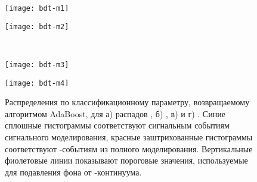 \begin{figure}[htb]
 \begin{minipage}[b]{0.5\textwidth}
  \centering
  \texttt{[image: bdt-m1]}
  \subcaption{}
  \label{fig:tmva_output_pi0}
 \end{minipage}
 \begin{minipage}[b]{0.5\textwidth}
  \centering
  \texttt{[image: bdt-m2]}
  \subcaption{}
  \label{fig:tmva_output_etagg}
 \end{minipage}
 \\
 \begin{minipage}[b]{0.5\textwidth}
  \centering
  \texttt{[image: bdt-m3]}
  \subcaption{}
  \label{fig:tmva_output_petappp}
 \end{minipage}
 \begin{minipage}[b]{0.5\textwidth}
  \centering
  \texttt{[image: bdt-m4]}
  \subcaption{}
  \label{fig:tmva_output_omega}
  \vspace{2 mm}
 \end{minipage}
  \caption{Распределения по классификационному параметру, возвращаемому алгоритмом AdaBoost, для а) распадов \bdpi, б) \bdetagg, в) \bdetappp и г) \bdomega.  Синие сплошные гистограммы соответствуют сигнальным событиям сигнального моделирования, красные заштрихованные гистограммы соответствуют \qqbar-событиям из полного моделирования.  Вертикальные фиолетовые линии показывают пороговые значения, используемые для подавления фона от \qqbar-континуума.}
  \label{fig:tmva_output}
 \end{figure}

